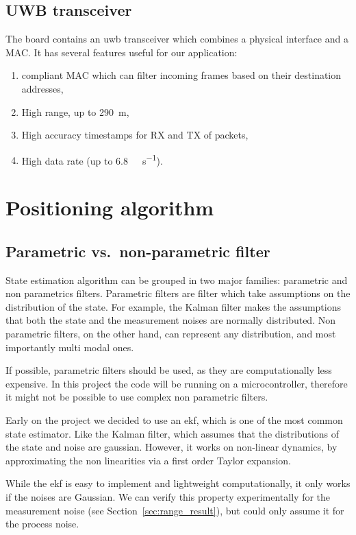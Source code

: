 \documentclass[a4paper, 12pt]{scrreprt}
\begin{document}
\section{UWB transceiver}
The board contains an \gls{uwb} transceiver which combines a physical interface and a MAC.
It has several features useful for our application:
\begin{enumerate}
    \item \ieeepan{} compliant MAC which can filter incoming frames based on their destination addresses,
    \item High range, up to \SI{290}{\meter},
    \item High accuracy timestamps for RX and TX of packets,
    \item High data rate (up to \SI{6.8}{\mega\bit\per\second}).
    \end{enumerate}

\chapter{Positioning algorithm}
\label{chap:algorithm}

\section{Parametric vs.\  non-parametric filter}

State estimation algorithm can be grouped in two major families: parametric and non parametrics filters.
Parametric filters are filter which take assumptions on the distribution of the state.
For example, the Kalman filter makes the assumptions that both the state and the measurement noises are normally distributed.
Non parametric filters, on the other hand, can represent any distribution, and most importantly multi modal ones.

If possible, parametric filters should be used, as they are computationally less expensive.
In this project the code will be running on a microcontroller, therefore it might not be possible to use complex non parametric filters.

Early on the project we decided to use an \gls{ekf}, which is one of the most common state estimator.
Like the Kalman filter, which assumes that the distributions of the state and noise are gaussian.
However, it works on non-linear dynamics, by approximating the non linearities via a first order Taylor expansion.

While the \gls{ekf} is easy to implement and lightweight computationally, it only works if the noises are Gaussian.
We can verify this property experimentally for the measurement noise (see Section~\ref{sec:range_result}), but could only assume it for the process noise.
\end{document}
